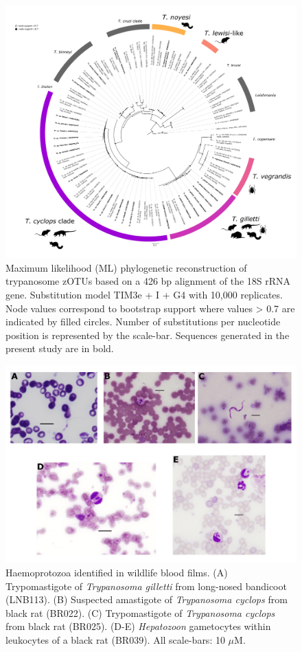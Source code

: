 \documentclass[a4paper, nobind]{templates/ociamthesis}
\begin{document}
\begin{figure}
\includegraphics[width=0.95\linewidth]{figures/ms-figs/Ch4-trypNGStree} \caption[Phylogeny of trypanosomes species from wildlife.]{Maximum likelihood (ML) phylogenetic reconstruction of trypanosome zOTUs based on a 426 bp alignment of the 18S rRNA gene. Substitution model TIM3e + I + G4 with 10,000 replicates. Node values correspond to bootstrap support where values > 0.7 are indicated by filled circles. Number of substitutions per nucleotide position is represented by the scale-bar. Sequences generated in the present study are in bold.}\label{fig:Ch4tryptree}
\end{figure}

\begin{figure}
\includegraphics[width=0.95\linewidth]{figures/ms-figs/Ch4-microscopy-images} \caption[Haemoprotozoans identified in wildlife blood films.]{Haemoprotozoa identified in wildlife blood films. (A) Trypomastigote of \textit{Trypanosoma gilletti} from long-nosed bandicoot (LNB113). (B) Suspected amastigote of \textit{Trypanosoma cyclops} from black rat (BR022). (C) Trypomastigote of \textit{Trypanosoma cyclops} from black rat (BR025). (D-E) \textit{Hepatozoon} gametocytes within leukocytes of a black rat (BR039). All scale-bars: 10 $\mu$M.}\label{fig:microscopy}
\end{figure}
\end{document}
